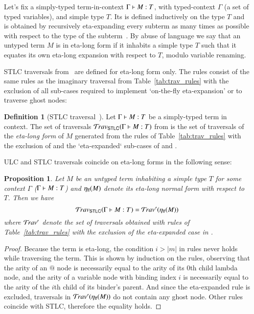\documentclass{elsarticle}
\theoremstyle{plain}
\newtheorem{proposition}[theorem]{Proposition}
\theoremstyle{definition}
\newtheorem{definition}{Definition}[section]
\theoremstyle{remark}
\newcommand{\ghostlmd}{{\lambda\!\!\lambda}}
\newcommand{\travulc}{\travset}
\newcommand{\travstlc}{{\travset_{\sf STLC}}}
\begin{document}
Let's fix a simply-typed term-in-context $\Gamma \vdash M :T$, with typed-context $\Gamma$ (a set of typed variables), and simple type $T$. Its  is defined inductively on the type $T$ and is obtained by recursively eta-expanding every subterm as many times as possible with respect to the type of the subterm~\cite{Ong2006,BlumPhd}.
By abuse of language we say that an untyped term $M$ is in eta-long form if it inhabits a simple type $T$ such that it equates its own eta-long expansion with respect to $T$, modulo variable renaming.

STLC traversals from~\cite{BlumPhd}
are defined for eta-long form only. The rules
consist of the same rules as the imaginary traversal from Table~\ref{tab:trav_rules} with the exclusion of all sub-cases required to implement `on-the-fly eta-expansion' or to traverse ghost nodes:
\begin{definition}[STLC traversal~\cite{BlumPhd}]
Let $\Gamma \vdash M : T$ be a simply-typed term in context. The set of traversals $\travstlc(\Gamma \entail M : T)$ from \cite{BlumPhd} is  the set of traversals of the \emph{eta-long form} of $M$ generated from the rules of Table~\ref{tab:trav_rules} with the exclusion of \rulenamet{Lam^\ghostlmd} and the `eta-expanded` sub-cases of  and .
\end{definition}

ULC and STLC traversals coincide on eta-long forms in the following sense:
\begin{proposition}
\label{prop:ulc_and_stlc_trav_coincide}
Let $M$ be an untyped term inhabiting a simple type $T$ for some context $\Gamma$ ($\Gamma \vdash M : T$) and $\eta_{\sf lf}(M)$ denote its \emph{eta-long normal form} with respect to $T$. Then  we have
$$\travstlc(\Gamma \entail M : T) = \travulc'(\etalf{M})$$
where $\travulc'$ denote the set of traversals obtained with rules of Table~\ref{tab:trav_rules} with the exclusion of the eta-expanded case in .
\end{proposition}
\begin{proof}
Because the term is eta-long, the condition $i>|m|$ in rules  never holds while traversing the term. This is shown by induction on the rules, observing that the arity of an $@$ node is necessarily equal to the arity of its $0$th child lambda node, and the arity of a variable node with binding index $i$ is necessarily equal to the arity of the $i$th child of its binder's parent.
And since the eta-expanded rule   is excluded, traversals in $\travulc'(\etalf{M})$ do not contain any ghost node. Other rules coincide with STLC, therefore the equality holds.
\end{proof}
\end{document}
